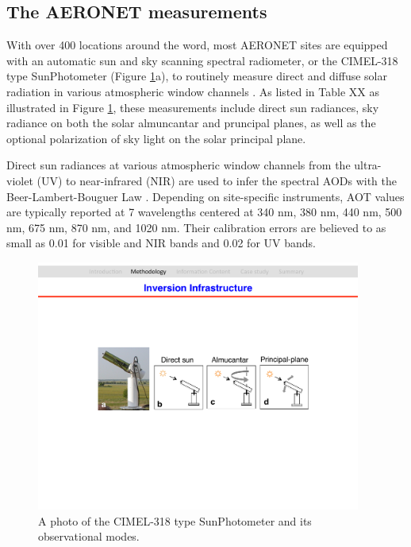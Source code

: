 \subsection{The AERONET measurements}

With over 400 locations around the word, most AERONET sites are equipped with
an automatic sun and sky scanning spectral radiometer, or the CIMEL-318 type
SunPhotometer (Figure \ref{fig:cimel318}a), to routinely measure direct and 
diffuse solar radiation in various atmospheric window channels \citep{Holben98}. 
As listed in Table XX as illustrated in Figure \ref{fig:cimel318}, these
measurements include direct sun radiances, sky radiance on both the solar
almuncantar and pruncipal planes, as well as the optional polarization of sky
light on the solar principal plane.

Direct sun radiances at various atmospheric window channels from the
ultra-violet (UV) to near-infrared (NIR) are used to infer the spectral AODs with the
Beer-Lambert-Bouguer Law \citep{Holben98,Smirnov00}. Depending on site-specific
instruments, AOT values are typically reported at 7 wavelengths centered at 340
nm, 380 nm, 440 nm, 500 nm, 675 nm, 870 nm, and 1020 nm. Their calibration
errors are believed to as small as 0.01 for visible and NIR bands and 0.02 for
UV bands.

\begin{figure}[t]
  \centering
  \includegraphics[width={0.95\textwidth}]{figures/cimel318.pdf}
  \caption{A photo of the CIMEL-318 type SunPhotometer and its observational 
modes.}
  \label{fig:cimel318}
\end{figure}



